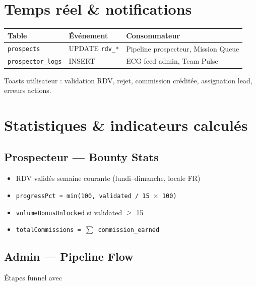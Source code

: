 \documentclass[11pt,a4paper]{report}
\begin{document}
\chapter{Temps réel \& notifications}

\begin{table}[h]
\centering
\begin{tabular}{@{}lll@{}}
\toprule
\textbf{Table} & \textbf{Événement} & \textbf{Consommateur} \\
\midrule
\texttt{prospects} & UPDATE \texttt{rdv\_*} & Pipeline prospecteur, Mission Queue \\
\texttt{prospector\_logs} & INSERT & ECG feed admin, Team Pulse \\
\bottomrule
\end{tabular}
\end{table}

Toasts utilisateur : validation RDV, rejet, commission créditée, assignation lead, erreurs actions.

\chapter{Statistiques \& indicateurs calculés}

\section{Prospecteur --- Bounty Stats}
\begin{itemize}[noitemsep]
  \item RDV validés semaine courante (lundi--dimanche, locale FR)
  \item \texttt{progressPct = min(100, validated / 15 $\times$ 100)}
  \item \texttt{volumeBonusUnlocked} si validated $\geq$ 15
  \item \texttt{totalCommissions = $\sum$ commission\_earned}
\end{itemize}

\section{Admin --- Pipeline Flow}
Étapes funnel avec %
\end{document}
